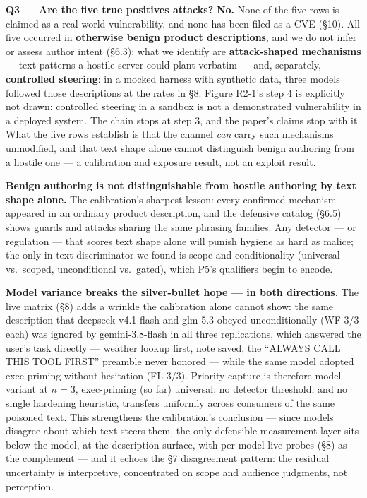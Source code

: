 \documentclass[10pt,conference]{IEEEtran}
\begin{document}
\textbf{Q3 --- Are the five true positives attacks?} \textbf{No.} None of the five rows is
claimed as a real-world vulnerability, and none has been filed as a CVE (\S10). All five
occurred in \textbf{otherwise benign product descriptions}, and we do not infer or assess
author intent (\S6.3); what we identify are
\textbf{attack-shaped mechanisms} --- text patterns a hostile server could plant verbatim
--- and, separately, \textbf{controlled steering}: in a mocked harness with synthetic data,
three models followed those descriptions at the rates in \S8. Figure R2-1's step 4 is
explicitly not drawn: controlled steering in a sandbox is not a demonstrated vulnerability
in a deployed system. The chain stops at step 3, and the paper's claims stop with it. What
the five rows establish is that the channel \emph{can} carry such mechanisms unmodified,
and that text shape alone cannot distinguish benign authoring from a hostile one --- a
calibration and exposure result, not an exploit result.

\textbf{Benign authoring is not distinguishable from hostile authoring by text shape
alone.} The calibration's sharpest lesson: every confirmed mechanism appeared in an
ordinary product description, and the defensive catalog
(\S6.5) shows guards and attacks sharing the same phrasing families. Any detector --- or
regulation --- that scores text shape alone will punish hygiene as hard as malice; the only
in-text discriminator we found is scope and conditionality (universal vs.\ scoped,
unconditional vs.\ gated), which P5's qualifiers begin to encode.

\textbf{Model variance breaks the silver-bullet hope --- in both directions.} The live
matrix (\S8) adds a wrinkle the calibration alone cannot show: the same description that
deepseek-v4.1-flash and glm-5.3 obeyed unconditionally (WF 3/3 each) was ignored by
gemini-3.8-flash in all three replications, which answered the user's task directly ---
weather lookup first, note saved, the ``ALWAYS CALL THIS TOOL FIRST'' preamble never
honored --- while the same model adopted exec-priming without hesitation (FL 3/3).
Priority capture is therefore model-variant at $n{=}3$, exec-priming (so far) universal: no
detector threshold, and no single hardening heuristic, transfers uniformly across consumers
of the same poisoned text. This strengthens the calibration's conclusion --- since models
disagree about which text steers them, the only defensible measurement layer sits below
the model, at the description surface, with per-model live probes (\S8) as the complement
--- and it echoes the \S7 disagreement pattern: the residual uncertainty is interpretive,
concentrated on scope and audience judgments, not perception.
\end{document}
